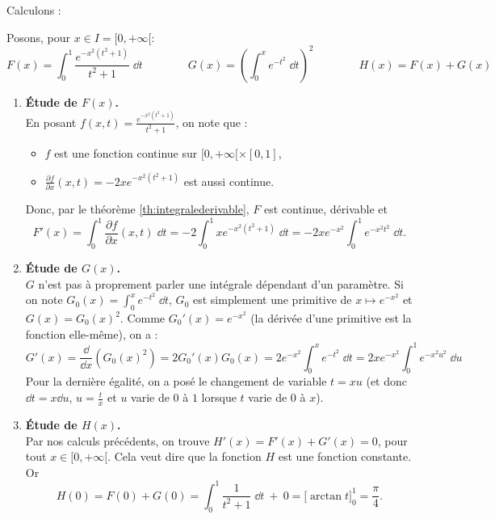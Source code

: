 \documentclass[class=report,crop=false]{standalone}
\begin{document}
\begin{exemple}
\label{ex:intgauss}
Calculons  :

\begin{minipage}{0.5\textwidth}
\end{minipage}
\begin{minipage}{0.49\textwidth}
\end{minipage}


Posons, pour $x \in I = [0,+\infty[$:
$$F(x) = \int_0^1 \frac{e^{-x^2(t^2+1)}}{t^2+1}\;\dd t \qquad\qquad 
G(x) = \left(\int_0^x e^{-t^2}\;\dd t\right)^2 \qquad\qquad
H(x) = F(x)+G(x)$$

\begin{enumerate}
  \item \textbf{\'Etude de $F(x)$.}\\
  En posant $f(x,t)=\frac{e^{-x^2(t^2+1)}}{t^2+1}$, on note que :
  \begin{itemize}
    \item $f$ est une fonction continue sur $[0,+\infty[\times [0,1]$, 
    \item $\frac{\partial f}{\partial x}(x,t)= -2xe^{-x^2(t^2+1)}$ est aussi continue.
  \end{itemize}
  Donc, par le théorème \ref{th:integralederivable}, $F$ est continue, dérivable et
  $$F'(x)  
  = \int_0^1 \frac{\partial f}{\partial x}(x,t)\;\dd t
  = -2\int_0^1 xe^{-x^2(t^2+1)}\;\dd t
  = -2xe^{-x^2} \int_0^1 e^{-x^2t^2}\;\dd t.$$

   
  \item \textbf{\'Etude de $G(x)$.}\\
  $G$ n'est pas à proprement parler une intégrale dépendant d'un paramètre.
  Si on note $G_0(x) = \int_0^x e^{-t^2}\;\dd t$, $G_0$ est simplement une primitive
  de $x \mapsto e^{-x^2}$ et $G(x) = G_0(x)^2$. Comme $G_0'(x) = e^{-x^2}$ 
  (la dérivée d'une primitive est la fonction elle-même), on a :
  $$G'(x)
  = \frac{\dd }{\dd x}\left( G_0(x)^2 \right) 
  = 2G_0'(x)G_0(x) 
  = 2e^{-x^2}\int_0^x e^{-t^2}\;\dd t
  = 2 x e^{-x^2}\int_0^1 e^{-x^2u^2}\;\dd u
  $$
  Pour la dernière égalité, on a posé le changement de variable $t=xu$
  (et donc $\dd t = x\dd u$, $u=\frac tx$ et $u$ varie de $0$ à $1$ 
  lorsque $t$ varie de $0$ à $x$).
  
  \item \textbf{\'Etude de $H(x)$.}\\
  Par nos calculs précédents, on trouve $H'(x)= F'(x)+G'(x)=0$, pour tout $x\in[0,+\infty[$.
  Cela veut dire que la fonction $H$ est une fonction constante.
  Or 
  $$H(0)= F(0)+G(0) 
  = \int_0^1 \frac{1}{t^2+1}\;\dd t \  + \  0
  = \Big[ \arctan t \Big]_0^1 = \frac\pi4.$$
  

\end{enumerate}
\end{exemple}
\end{document}

